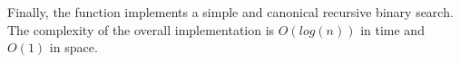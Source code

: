 Finally, the function  implements a simple and canonical recursive binary search. 
The complexity of the overall implementation is $O(log(n))$ in time and $O(1)$ in space.



